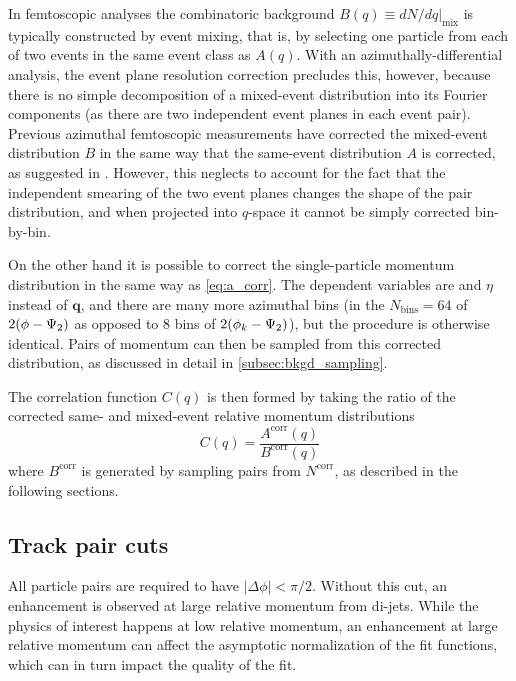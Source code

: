 In femtoscopic analyses the combinatoric background $B(q) \equiv \left. dN/dq \right|_{\textrm{mix}}$ is typically constructed by event mixing, that is, by selecting one particle from each of two events in the same event class as $A(q)$.
With an azimuthally-differential analysis, the event plane resolution correction precludes this, however, because there is no simple decomposition of a mixed-event distribution into its Fourier components (as there are two independent event planes in each event pair).
Previous azimuthal femtoscopic measurements have corrected the mixed-event distribution $B$ in the same way that the same-event distribution $A$ is corrected, as suggested in .
However, this neglects to account for the fact that the independent smearing of the two event planes changes the shape of the pair distribution, and when projected into $q$-space it cannot be simply corrected bin-by-bin.

On the other hand it is possible to correct the single-particle momentum distribution in the same way as \cref{eq:a_corr}.
The dependent variables are \pt and $\eta$ instead of $\mathbf{q}$, and there are many more azimuthal bins (in \Eqn{\ref{eq:xi_def}} the $N_\textrm{bins} = 64$ of $2(\phi - \Psi_{2})$ as opposed to 8 bins of $2(\phi_{k} - \Psi_{2})$), but the procedure is otherwise identical.
Pairs of momentum can then be sampled from this corrected distribution, as discussed in detail in \cref{subsec:bkgd_sampling}.

The correlation function $C(q)$ is then formed by taking the ratio of the corrected same- and mixed-event relative momentum distributions
\begin{equation}
  C(q) = \frac{A^\textrm{corr}(q)}{B^\textrm{corr}(q)}
\end{equation}
where $B^\textrm{corr}$ is generated by sampling pairs from $N^\textrm{corr}$, as described in the following sections.


\subsection{Track pair cuts}
All particle pairs are required to have $\left| \Delta \phi \right| < \pi/2$.
Without this cut, an enhancement is observed at large relative momentum from di-jets.
While the physics of interest happens at low relative momentum, an enhancement at large relative momentum can affect the asymptotic normalization of the fit functions, which can in turn impact the quality of the fit.


